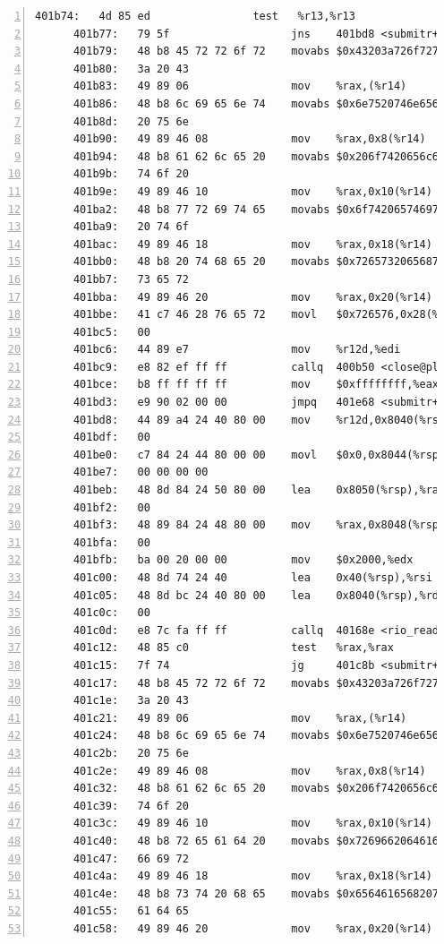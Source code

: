 \documentclass{article}
\begin{document}
\begin{lstlisting}[title = bomb的反汇编代码及部分注释, xleftmargin = 2em,xrightmargin = 2em, aboveskip = 1em, numbers = left, basicstyle=\scriptsize\ttfamily, numberstyle=\scriptsize]
      401b74:	4d 85 ed             	test   %r13,%r13
      401b77:	79 5f                	jns    401bd8 <submitr+0x42c>
      401b79:	48 b8 45 72 72 6f 72 	movabs $0x43203a726f727245,%rax
      401b80:	3a 20 43 
      401b83:	49 89 06             	mov    %rax,(%r14)
      401b86:	48 b8 6c 69 65 6e 74 	movabs $0x6e7520746e65696c,%rax
      401b8d:	20 75 6e 
      401b90:	49 89 46 08          	mov    %rax,0x8(%r14)
      401b94:	48 b8 61 62 6c 65 20 	movabs $0x206f7420656c6261,%rax
      401b9b:	74 6f 20 
      401b9e:	49 89 46 10          	mov    %rax,0x10(%r14)
      401ba2:	48 b8 77 72 69 74 65 	movabs $0x6f74206574697277,%rax
      401ba9:	20 74 6f 
      401bac:	49 89 46 18          	mov    %rax,0x18(%r14)
      401bb0:	48 b8 20 74 68 65 20 	movabs $0x7265732065687420,%rax
      401bb7:	73 65 72 
      401bba:	49 89 46 20          	mov    %rax,0x20(%r14)
      401bbe:	41 c7 46 28 76 65 72 	movl   $0x726576,0x28(%r14)
      401bc5:	00 
      401bc6:	44 89 e7             	mov    %r12d,%edi
      401bc9:	e8 82 ef ff ff       	callq  400b50 <close@plt>
      401bce:	b8 ff ff ff ff       	mov    $0xffffffff,%eax
      401bd3:	e9 90 02 00 00       	jmpq   401e68 <submitr+0x6bc>
      401bd8:	44 89 a4 24 40 80 00 	mov    %r12d,0x8040(%rsp)
      401bdf:	00 
      401be0:	c7 84 24 44 80 00 00 	movl   $0x0,0x8044(%rsp)
      401be7:	00 00 00 00 
      401beb:	48 8d 84 24 50 80 00 	lea    0x8050(%rsp),%rax
      401bf2:	00 
      401bf3:	48 89 84 24 48 80 00 	mov    %rax,0x8048(%rsp)
      401bfa:	00 
      401bfb:	ba 00 20 00 00       	mov    $0x2000,%edx
      401c00:	48 8d 74 24 40       	lea    0x40(%rsp),%rsi
      401c05:	48 8d bc 24 40 80 00 	lea    0x8040(%rsp),%rdi
      401c0c:	00 
      401c0d:	e8 7c fa ff ff       	callq  40168e <rio_readlineb>
      401c12:	48 85 c0             	test   %rax,%rax
      401c15:	7f 74                	jg     401c8b <submitr+0x4df>
      401c17:	48 b8 45 72 72 6f 72 	movabs $0x43203a726f727245,%rax
      401c1e:	3a 20 43 
      401c21:	49 89 06             	mov    %rax,(%r14)
      401c24:	48 b8 6c 69 65 6e 74 	movabs $0x6e7520746e65696c,%rax
      401c2b:	20 75 6e 
      401c2e:	49 89 46 08          	mov    %rax,0x8(%r14)
      401c32:	48 b8 61 62 6c 65 20 	movabs $0x206f7420656c6261,%rax
      401c39:	74 6f 20 
      401c3c:	49 89 46 10          	mov    %rax,0x10(%r14)
      401c40:	48 b8 72 65 61 64 20 	movabs $0x7269662064616572,%rax
      401c47:	66 69 72 
      401c4a:	49 89 46 18          	mov    %rax,0x18(%r14)
      401c4e:	48 b8 73 74 20 68 65 	movabs $0x6564616568207473,%rax
      401c55:	61 64 65 
      401c58:	49 89 46 20          	mov    %rax,0x20(%r14)

\end{lstlisting}
\end{document}
